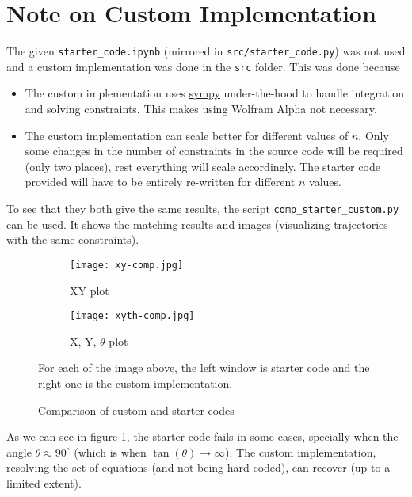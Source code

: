 \section{Note on Custom Implementation}
\label{sec:note-custom-impl}

The given \texttt{starter\_code.ipynb} (mirrored in \texttt{src/starter\_code.py}) was not used and a custom implementation was done in the \texttt{src} folder. This was done because

\begin{itemize}
    \item The custom implementation uses \href{https://docs.sympy.org/latest/index.html}{sympy} under-the-hood to handle integration and solving constraints. This makes using Wolfram Alpha not necessary.
    \item The custom implementation can scale better for different values of $n$. Only some changes in the number of constraints in the source code will be required (only two places), rest everything will scale accordingly. The starter code provided will have to be entirely re-written for different $n$ values.
\end{itemize}

To see that they both give the same results, the script \texttt{comp\_starter\_custom.py} can be used. It shows the matching results and images (visualizing trajectories with the same constraints).

\begin{figure}[ht]
    \centering
    \begin{subfigure}[b]{0.6\textwidth}
        \centering
        \texttt{[image: xy-comp.jpg]}
        \caption{XY plot}
    \end{subfigure}
    \begin{subfigure}[b]{0.3\textwidth}
        \centering
        \texttt{[image: xyth-comp.jpg]}
        \caption{X, Y, $\theta$ plot}
    \end{subfigure}
    \caption{Comparison of custom and starter codes}
    \label{fig:custom-starter-traj-comp}
    \small
        For each of the image above, the left window is starter code and the right one is the custom implementation.
\end{figure}

As we can see in figure \ref{fig:custom-starter-traj-comp}, the starter code fails in some cases, specially when the angle $\theta \approx 90^\circ$ (which is when $\tan(\theta) \rightarrow \infty$). The custom implementation, resolving the set of equations (and not being hard-coded), can recover (up to a limited extent).

